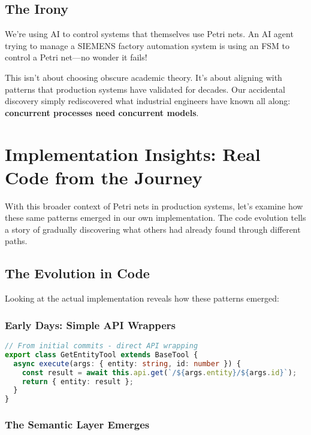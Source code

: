 \documentclass[11pt,a4paper]{article}
\begin{document}
\subsection{The Irony}

We're using AI to control systems that themselves use Petri nets. An AI agent trying to manage a SIEMENS factory automation system is using an FSM to control a Petri net—no wonder it fails!

This isn't about choosing obscure academic theory. It's about aligning with patterns that production systems have validated for decades. Our accidental discovery simply rediscovered what industrial engineers have known all along: \textbf{concurrent processes need concurrent models}.

\section{Implementation Insights: Real Code from the Journey}

With this broader context of Petri nets in production systems, let's examine how these same patterns emerged in our own implementation. The code evolution tells a story of gradually discovering what others had already found through different paths.

\subsection{The Evolution in Code}

Looking at the actual implementation reveals how these patterns emerged:

\subsubsection{Early Days: Simple API Wrappers}

\begin{lstlisting}[language=TypeScript]
// From initial commits - direct API wrapping
export class GetEntityTool extends BaseTool {
  async execute(args: { entity: string, id: number }) {
    const result = await this.api.get(`/${args.entity}/${args.id}`);
    return { entity: result };
  }
}
\end{lstlisting}

\subsubsection{The Semantic Layer Emerges}
\end{document}
